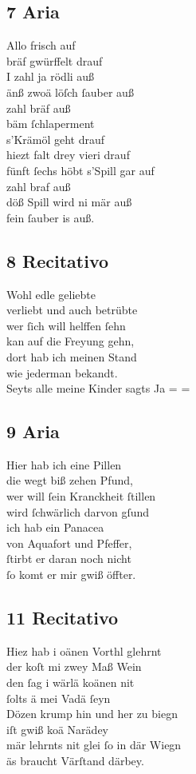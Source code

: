\documentclass{ees}
\newenvironment{lyrics}[1]{%
  \subsection{#1}\nopagebreak%
  \begin{lyricslist}%
  \let\voice\item%
}{%
  \end{lyricslist}%
}
\begin{document}
\begin{lyrics}{7 Aria}
  \voice[H.-Krämer]
  Allo frisch auf\\
  bräf gwürffelt drauf\\
  I zahl ja rödli auß\\
  änß zwoä löſch ſauber auß\\
  zahl bräf auß\\
  bäm ſchlaperment\\
  s’Krämöl geht drauf\\
  hiezt falt drey vieri drauf\\
  fünft ſechs höbt s’Spill gar auf\\
  zahl braf auß\\
  döß Spill wird ni mär auß\\
  fein ſauber is auß.
\end{lyrics}

\begin{lyrics}{8 Recitativo}
  \voice[Arzt]
  Wohl edle geliebte\\
  verliebt und auch betrübte\\
  wer ſich will helffen ſehn\\
  kan auf die Freyung gehn,\\
  dort hab ich meinen Stand\\
  wie jederman bekandt.\\
  Seyts alle meine Kinder sagts Ja = =
\end{lyrics}

\begin{lyrics}{9 Aria}
  \voice[Arzt]
  Hier hab ich eine Pillen\\
  die wegt biß zehen Pfund,\\
  wer will ſein Kranckheit ſtillen\\
  wird ſchwärlich darvon gſund\\
  ich hab ein Panacea\\
  von Aquafort und Pfeffer,\\
  ſtirbt er daran noch nicht\\
  ſo komt er mir gwiß öffter.
\end{lyrics}

\begin{lyrics}{11 Recitativo}
  \voice[Sagfäller]
  Hiez hab i oänen Vorthl glehrnt\\
  der koſt mi zwey Maß Wein\\
  den ſag i wärlä koänen nit\\
  ſolts ä mei Vadä ſeyn\\
  Dözen krump hin und her zu biegn\\
  iſt gwiß koä Narädey\\
  mär lehrnts nit glei ſo in där Wiegn\\
  äs braucht Värſtand därbey.
\end{lyrics}
\end{document}
